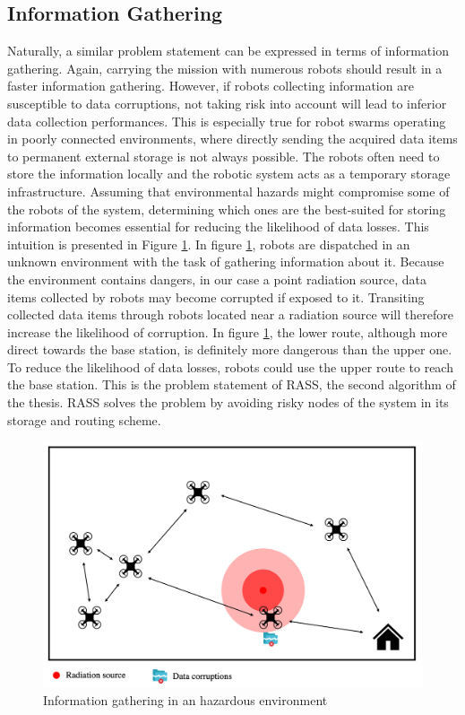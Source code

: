 \subsection{Information Gathering}
\label{sec:problemInformation}
Naturally, a similar problem statement can be expressed in terms of information gathering. Again, carrying the mission with numerous robots should result in a faster information gathering. However, if robots collecting information are susceptible to data corruptions, not taking risk into account will lead to inferior data collection performances. This is especially true for robot swarms operating in poorly connected environments, where directly sending the acquired data items to permanent external storage is not always possible. The robots often need to store the information locally and the robotic system acts as a temporary storage infrastructure. Assuming that environmental hazards might compromise some of the robots of the system, determining which ones are the best-suited for storing information becomes essential for reducing the likelihood of data losses. This intuition is presented in Figure \ref{statementRASS}. In figure \ref{statementRASS}, robots are dispatched in an unknown environment with the task of gathering information about it. Because the environment contains dangers, in our case a point radiation source, data items collected by robots may become corrupted if exposed to it. Transiting collected data items through robots located near a radiation source will therefore increase the likelihood of corruption. In figure \ref{statementRASS}, the lower route, although more direct towards the base station, is definitely more dangerous than the upper one. To reduce the likelihood of data losses, robots could use the upper route to reach the base station. This is the problem statement of RASS, the second algorithm of the thesis. RASS solves the problem by avoiding risky nodes of the system in its storage and routing scheme.

\begin{figure}[h]
	\centering
    \includegraphics[width=1\columnwidth]{images/statementRASS.png}
    \caption{Information gathering in an hazardous environment}
    \label{statementRASS}
\end{figure}


